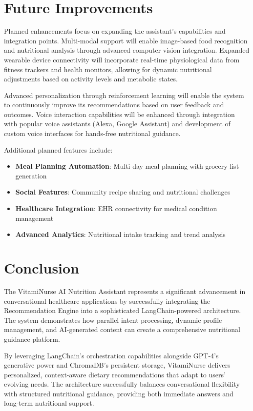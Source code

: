 \section{Future Improvements}
Planned enhancements focus on expanding the assistant's capabilities and integration points. Multi-modal support will enable image-based food recognition and nutritional analysis through advanced computer vision integration. Expanded wearable device connectivity will incorporate real-time physiological data from fitness trackers and health monitors, allowing for dynamic nutritional adjustments based on activity levels and metabolic states.

Advanced personalization through reinforcement learning will enable the system to continuously improve its recommendations based on user feedback and outcomes. Voice interaction capabilities will be enhanced through integration with popular voice assistants (Alexa, Google Assistant) and development of custom voice interfaces for hands-free nutritional guidance.

Additional planned features include:
\begin{itemize}
\item \textbf{Meal Planning Automation}: Multi-day meal planning with grocery list generation
\item \textbf{Social Features}: Community recipe sharing and nutritional challenges
\item \textbf{Healthcare Integration}: EHR connectivity for medical condition management
\item \textbf{Advanced Analytics}: Nutritional intake tracking and trend analysis
\end{itemize}

\section{Conclusion}
The VitamiNurse AI Nutrition Assistant represents a significant advancement in conversational healthcare applications by successfully integrating the Recommendation Engine into a sophisticated LangChain-powered architecture. The system demonstrates how parallel intent processing, dynamic profile management, and AI-generated content can create a comprehensive nutritional guidance platform.

By leveraging LangChain's orchestration capabilities alongside GPT-4's generative power and ChromaDB's persistent storage, VitamiNurse delivers personalized, context-aware dietary recommendations that adapt to users' evolving needs. The architecture successfully balances conversational flexibility with structured nutritional guidance, providing both immediate answers and long-term nutritional support.

